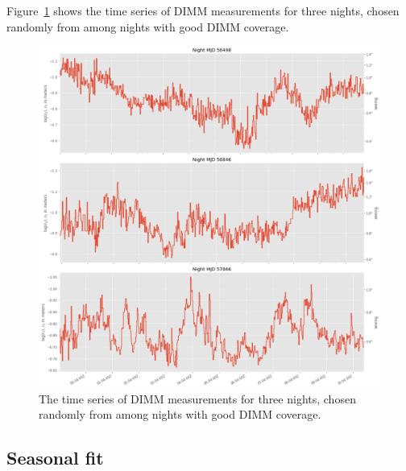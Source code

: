 \documentclass[DM,authoryear,toc]{lsstdoc}
\begin{document}


Figure~\ref{fig:random-nights-dimm} shows the time series of DIMM
measurements for three nights, chosen randomly from among nights with
good DIMM coverage. 

\begin{figure}
  \includegraphics[width=\columnwidth]{./figures/random_nights_dimm.png}
  \caption{The time series of DIMM
measurements for three nights, chosen randomly from among nights with
good DIMM coverage. }
  \label{fig:random-nights-dimm}
\end{figure}

\subsection{Seasonal fit}
\label{sec:seasonal}
\end{document}
